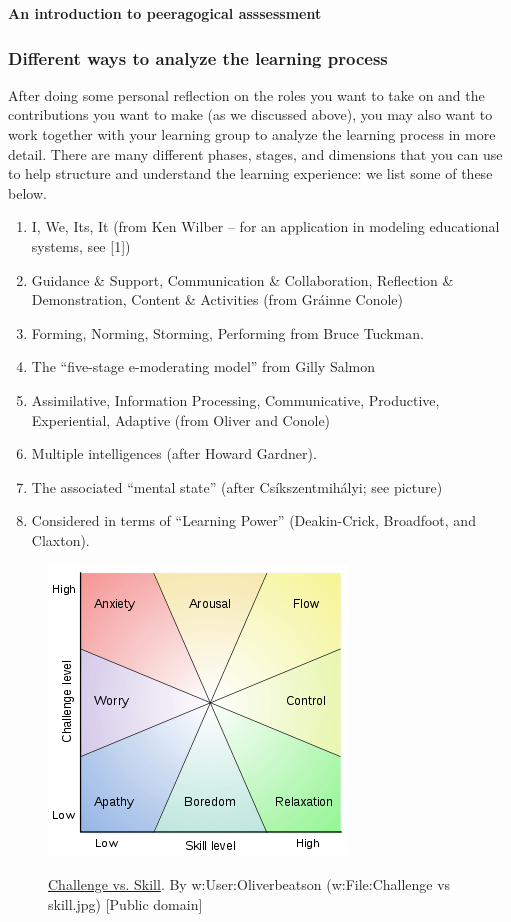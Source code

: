 \textbf{An introduction to peeragogical asssessment}

\subsubsection{Different ways to analyze the learning process}

After doing some personal reflection on the roles you want to take on
and the contributions you want to make (as we discussed above), you may
also want to work together with your learning group to analyze the
learning process in more detail. There are many different phases,
stages, and dimensions that you can use to help structure and understand
the learning experience: we list some of these below.

\begin{enumerate}
\item
  I, We, Its, It (from Ken Wilber -- for an application in modeling
  educational systems, see {[}1{]})
\item
  Guidance \& Support, Communication \& Collaboration, Reflection \&
  Demonstration, Content \& Activities (from Gráinne Conole)
\item
  Forming, Norming, Storming, Performing from Bruce Tuckman.
\item
  The ``five-stage e-moderating model'' from Gilly Salmon
\item
  Assimilative, Information Processing, Communicative, Productive,
  Experiential, Adaptive (from Oliver and Conole)
\item
  Multiple intelligences (after Howard Gardner).
\item
  The associated ``mental state'' (after Csíkszentmihályi; see picture)
\item
  Considered in terms of ``Learning Power'' (Deakin-Crick, Broadfoot,
  and Claxton).
\end{enumerate}

\begin{figure}
\begin{center}
\href{http://commons.wikimedia.org/wiki/File\%3AChallenge\_vs\_skill.svg}{\includegraphics[width=.6\textwidth]{../pictures/challenge.png}}
\end{center}
\caption*{
 \href{http://commons.wikimedia.org/wiki/File\%3AChallenge\_vs\_skill.svg}{Challenge
 vs. Skill}. By w:User:Oliverbeatson (w:File:Challenge vs skill.jpg)
{[}Public domain{]}}
\end{figure}

